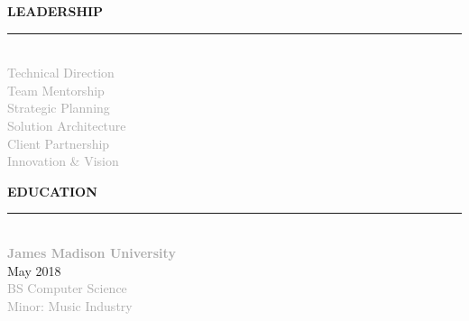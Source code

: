 \documentclass[10pt,letterpaper]{article}
\newcommand{\sidebarheader}[1]{%
    \vspace{8pt}
    {\headingfont\small\textcolor{accent}{\MakeUppercase{\textbf{#1}}}}
    \vspace{2pt}
    \par\noindent\textcolor{accent}{\rule{\linewidth}{1.5pt}}
    \vspace{3pt}
}
\begin{document}
{\begin{minipage}[t][10.5in][t]{2.7in}
\begin{minipage}{2.1in}
\sidebarheader{Leadership}
{\scriptsize\textcolor{darkgray}{\\[-6pt]
Technical Direction\\[3pt]
Team Mentorship\\[3pt]
Strategic Planning\\[3pt]
Solution Architecture\\[3pt]
Client Partnership\\[3pt]
Innovation \& Vision\\[3pt]
}}

\sidebarheader{Education}
{\footnotesize\\[-6pt]
\textbf{\textcolor{darkgray}{James Madison University}}\\[3pt]
\textcolor{mediumgray}{May 2018}\\[3pt]
\textcolor{darkgray}{BS Computer Science\\[3pt]
Minor: Music Industry}
}

\end{minipage}
\end{minipage}%
}%
\hspace{0pt}%
\end{document}
